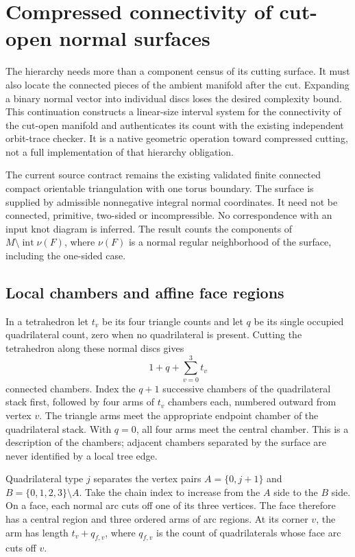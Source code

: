 \section{Compressed connectivity of cut-open normal surfaces}
\label{sec:cut-complement}

The hierarchy needs more than a component census of its cutting surface.
It must also locate the connected pieces of the ambient manifold after the
cut. Expanding a binary normal vector into individual discs loses the desired
complexity bound. This continuation constructs a linear-size interval system
for the connectivity of the cut-open manifold and authenticates its count
with the existing independent orbit-trace checker. It is a native geometric
operation toward compressed cutting, not a full implementation of that
hierarchy obligation.

The current source contract remains the existing validated finite connected
compact orientable triangulation with one torus boundary. The surface is
supplied by admissible nonnegative integral normal coordinates. It need not
be connected, primitive, two-sided or incompressible. No correspondence with
an input knot diagram is inferred. The result counts the components of
$M\setminus\operatorname{int}\nu(F)$, where $\nu(F)$ is a normal regular
neighborhood of the surface, including the one-sided case.

\subsection{Local chambers and affine face regions}

In a tetrahedron let $t_v$ be its four triangle counts and let $q$ be its
single occupied quadrilateral count, zero when no quadrilateral is present.
Cutting the tetrahedron along these normal discs gives
\[
                 1+q+\sum_{v=0}^{3}t_v
\]
connected chambers. Index the $q+1$ successive chambers of the quadrilateral
stack first, followed by four arms of $t_v$ chambers each, numbered outward
from vertex $v$. The triangle arms meet the appropriate endpoint chamber
of the quadrilateral stack. With $q=0$, all four arms meet the central chamber.
This is a description of the chambers; adjacent chambers separated by the
surface are never identified by a local tree edge.

Quadrilateral type $j$ separates the vertex pairs
$A=\{0,j+1\}$ and $B=\{0,1,2,3\}\setminus A$.
Take the chain index to increase from the $A$ side to the $B$ side. On a
face, each normal arc cuts off one of its three vertices. The face therefore
has a central region and three ordered arms of arc regions. At its corner
$v$, the arm has length $t_v+q_{f,v}$, where $q_{f,v}$ is the count of
quadrilaterals whose face arc cuts off $v$.

